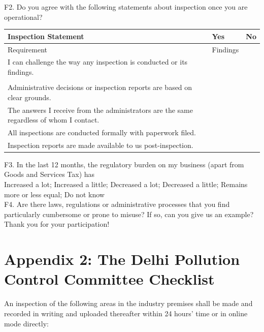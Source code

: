 \documentclass[a4paper, 12pt, twoside]{article}
\begin{document}
\begin{mdframed}[backgroundcolor=gray!20]
		F2. Do you agree with the following statements about inspection once you are operational? \\
		
		\begin{longtable}{>{\raggedright}p{7.5cm}>{\raggedright\arraybackslash}p{3.25cm}>{\raggedright\arraybackslash}p{3.25cm}}
\toprule
Inspection Statement & Yes & No \\
\midrule
\endfirsthead
\toprule
Requirement & Findings \\
\midrule
\endhead
\endfoot
\endlastfoot
I can challenge the way any inspection is conducted or its findings. \\
&  & \\
Administrative decisions or inspection reports are based on clear grounds. &  & \\
The answers I receive from the administrators are the same regardless of whom I contact. &  & \\
All inspections are conducted formally with paperwork filed. &  & \\
Inspection reports are made available to us post-inspection. &  & \\
\bottomrule
\end{longtable}
				
		F3. In the last 12 months, the regulatory burden on my business (apart from Goods and Services Tax) has \\
		
		Increased a lot; Increased a little; Decreased a lot; Decreased a little; Remains more or less equal; Do not know \\
		
		F4. Are there laws, regulations or administrative processes that you find particularly cumbersome or prone to misuse? If so, can you give us an example? \\
		
		Thank you for your participation!
		\end{mdframed}
		
		\newpage
		\section*{Appendix 2: The Delhi Pollution Control Committee Checklist}
		\normalsize
		\singlespacing
		
		An inspection of the following areas in the industry premises shall be made and recorded in writing and uploaded thereafter within 24 hours’ time or in online mode directly:
		
\end{document}
